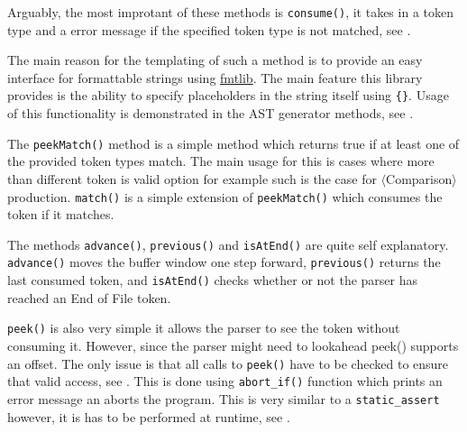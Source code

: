 Arguably, the most improtant of these methods is
\texttt{consume()}, it takes in a token type and a error message
if the specified token type is not matched, see
.



The main reason for the templating of such a method is to
provide an easy interface for formattable strings using
\href{https://github.com/fmtlib/fmt}{fmtlib}. The main feature
this library provides is the ability to specify placeholders
in the string itself using \texttt{\{\}}. Usage of this
functionality is demonstrated in the AST generator methods, see
.



The \texttt{peekMatch()} method is a simple method which returns
true if at least one of the provided token types match. The main
usage for this is cases where more than different token is valid
option for example such is the case for
$\langle$Comparison$\rangle$ production. \texttt{match()} is a
simple extension of \texttt{peekMatch()} which consumes the
token if it matches.

The methods \texttt{advance()}, \texttt{previous()} and
\texttt{isAtEnd()} are quite self explanatory.
\texttt{advance()} moves the buffer window one step forward,
\texttt{previous()} returns the last consumed token, and
\texttt{isAtEnd()} checks whether or not the parser has reached
an End of File token.

\texttt{peek()} is also very simple it allows the parser to see
the token without consuming it. However, since the parser might
need to lookahead peek() supports an offset. The only issue is
that all calls to \texttt{peek()} have to be checked to ensure
that valid access, see . This is done using \texttt{abort\_if()}
function which prints an error message an aborts the program.
This is very similar to a \texttt{static\_assert} however, it is
has to be performed at runtime, see .





